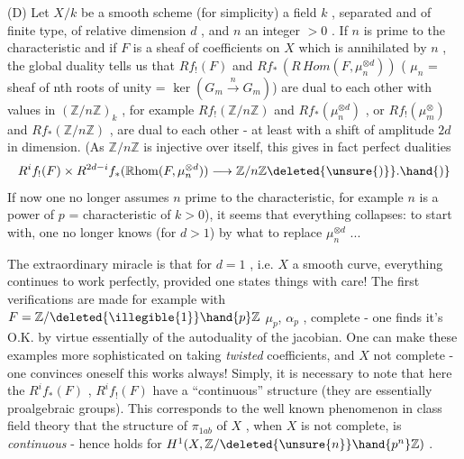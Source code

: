 
(D) Let $X/k$ be a smooth scheme (for simplicity)  a field $k$ , separated
and of finite type, of relative dimension $d$ , and $n$ an integer $>0$ .
If $n$ is prime to the characteristic and if $F$ is a sheaf of coefficients
on $X$ which is annihilated by $n$ , the global duality tells us that $Rf_!(F)$
and $Rf_*\,(R\,\mathit{Hom}(F,\mu_n^{\otimes d}))$ ( $\mu_n$ = sheaf of nth roots of unity = $\ker(G_m \xrightarrow{n} G_m)$)
are dual to each other with values in $(\mathbb{Z}/n\mathbb{Z})_k$ , for example $Rf_!(\mathbb{Z}/n\mathbb{Z})$
and $Rf_*(\mu_n^{\otimes d})$ , or $Rf_!(\mu_m^{\otimes})$ and $Rf_*(\mathbb{Z}/n\mathbb{Z})$ , are dual to each other - at
least with a shift of amplitude $2d$ in dimension. (As $\mathbb{Z}/n\mathbb{Z}$ is injective
over itself, this gives in fact perfect dualities
\[ R^if_!(F) \times R^{2d-i}f_*(\mathbb{R}\mathrm{hom}(F, \mu_n^{\otimes d})) \longrightarrow \mathbb{Z}/n\mathbb{Z}\deleted{\unsure{)}}. \hand{)} \]
If now one no longer assumes $n$ prime to the characteristic, for example $n$
is a power of $p$ = characteristic of $k > 0$), it seems that everything
collapses: to start with, one no longer knows (for $d > 1$) by what to replace
$\mu_n^{\otimes d}$ ...

The extraordinary miracle is that for $d = 1$ , i.e. $X$ a smooth curve,
everything continues to work perfectly, provided one states things with care!
The first verifications are made for example with $F = \mathbb{Z}/\deleted{\illegible{1}}\hand{p}\mathbb{Z}$\hand{,} $\mu_p$,  $\alpha_p$ , 
complete - one finds it's O.K. by virtue essentially of the autoduality
of the jacobian. One can make these examples more sophisticated on taking
\textit{twisted} coefficients, and $X$ not complete - one convinces oneself this works
always! Simply, it is necessary to note that here the $R^if_*(F)$ , $R^if_!(F)$
have a ``continuous'' structure (they are essentially proalgebraic groups).
This corresponds to the well known phenomenon in class field theory that the
structure of $\pi_{1ab}$ of $X$ , when $X$ is not complete, is \textit{continuous} - hence
 holds for $H^1(X, \mathbb{Z}/\deleted{\unsure{n}}\hand{p^n}\mathbb{Z})$ .

